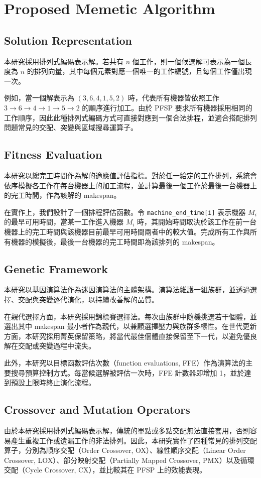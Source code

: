 \documentclass[conference]{IEEEtran}
\begin{document}
\section{Proposed Memetic Algorithm}
\subsection{Solution Representation}
本研究採用排列式編碼表示解。若共有 \(n\) 個工作，則一個候選解可表示為一個長度為 \(n\) 的排列向量，其中每個元素對應一個唯一的工作編號，且每個工作僅出現一次。

例如，當一個解表示為 \((3,6,4,1,5,2)\) 時，代表所有機器皆依照工作 \(3 \rightarrow 6 \rightarrow 4 \rightarrow 1 \rightarrow 5 \rightarrow 2\) 的順序進行加工。由於 PFSP 要求所有機器採用相同的工作順序，因此此種排列式編碼方式可直接對應到一個合法排程，並適合搭配排列問題常見的交配、突變與區域搜尋運算子。
\subsection{Fitness Evaluation}
本研究以總完工時間作為解的適應值評估指標。對於任一給定的工作排列，系統會依序模擬各工作在每台機器上的加工流程，並計算最後一個工作於最後一台機器上的完工時間，作為該解的 makespan。

在實作上，我們設計了一個排程評估函數。令 \texttt{machine\_end\_time[i]} 表示機器 \(M_i\) 的最早可用時間，當某一工作進入機器 \(M_i\) 時，其開始時間取決於該工作在前一台機器上的完工時間與該機器目前最早可用時間兩者中的較大值。完成所有工作與所有機器的模擬後，最後一台機器的完工時間即為該排列的 makespan。
\subsection{Genetic Framework}

本研究以基因演算法作為迷因演算法的主體架構。演算法維護一組族群，並透過選擇、交配與突變逐代演化，以持續改善解的品質。

在親代選擇方面，本研究採用錦標賽選擇法。每次由族群中隨機挑選若干個體，並選出其中 makespan 最小者作為親代，以兼顧選擇壓力與族群多樣性。在世代更新方面，本研究採用菁英保留策略，將當代最佳個體直接保留至下一代，以避免優良解在交配或突變過程中流失。

此外，本研究以目標函數評估次數（function evaluations, FFE）作為演算法的主要搜尋預算控制方式。每當候選解被評估一次時，FFE 計數器即增加 1，並於達到預設上限時終止演化流程。
\subsection{Crossover and Mutation Operators}
由於本研究採用排列式編碼表示解，傳統的單點或多點交配無法直接套用，否則容易產生重複工作或遺漏工作的非法排列。因此，本研究實作了四種常見的排列交配算子，分別為順序交配（Order Crossover, OX）、線性順序交配（Linear Order Crossover, LOX）、部分映射交配（Partially Mapped Crossover, PMX）以及循環交配（Cycle Crossover, CX），並比較其在 PFSP 上的效能表現。
\end{document}
